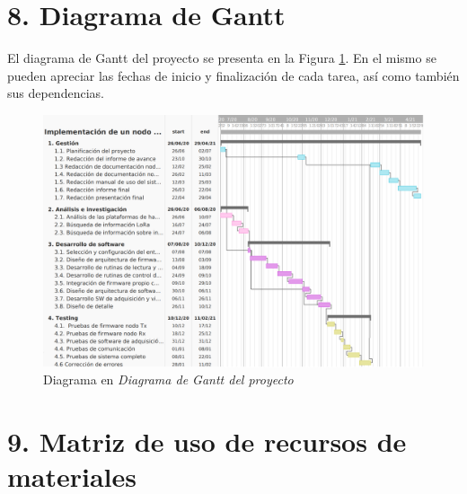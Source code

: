 \documentclass[11pt]{charter}
\begin{document}
\section{8. Diagrama de Gantt}
\label{sec:gantt}

El diagrama de Gantt del proyecto se presenta en la Figura \ref{fig:Gantt}. En el mismo se pueden apreciar las fechas de inicio y finalización de cada tarea, así como también sus dependencias.

\begin{landscape}
\begin{figure}[htpb]
\centering 
\includegraphics[width=1.5\textheight]{./Figuras/gantt.png}
\caption{Diagrama en \textit{Diagrama de Gantt del proyecto}}
\label{fig:Gantt}
\end{figure}
\end{landscape}
\section{9. Matriz de uso de recursos de materiales}
\label{sec:recursos}
\end{document}
